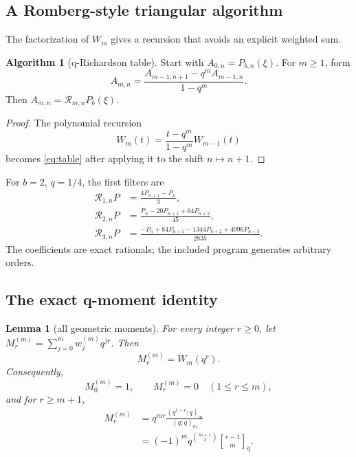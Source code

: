 \documentclass[11pt]{article}
\newtheorem{lemma}[theorem]{Lemma}
\theoremstyle{definition}
\newtheorem{algorithm}[theorem]{Algorithm}
\theoremstyle{remark}
\newcommand{\qbinom}[2]{\genfrac{[}{]}{0pt}{}{#1}{#2}_{q}}
\begin{document}
\subsection{A Romberg-style triangular algorithm}

The factorization of \(W_m\) gives a recursion that avoids an explicit weighted
sum.

\begin{algorithm}[q-Richardson table]
\label{alg:table}
Start with \(A_{0,n}=P_{b,n}(\xi)\). For \(m\geq1\), form
\begin{equation}
 A_{m,n}=\frac{A_{m-1,n+1}-q^mA_{m-1,n}}{1-q^m}.
 \label{eq:table}
\end{equation}
Then \(A_{m,n}=\mathcal R_{m,n}P_b(\xi)\).
\end{algorithm}

\begin{proof}
The polynomial recursion
\[
 W_m(t)=\frac{t-q^m}{1-q^m}W_{m-1}(t)
\]
becomes \eqref{eq:table} after applying it to the shift \(n\mapsto n+1\).
\end{proof}

For \(b=2\), \(q=1/4\), the first filters are
\begin{align}
 \mathcal R_{1,n}P&=\frac{4P_{n+1}-P_n}{3},
 \label{eq:m1}\\
 \mathcal R_{2,n}P&=\frac{P_n-20P_{n+1}+64P_{n+2}}{45},
 \label{eq:m2}\\
 \mathcal R_{3,n}P&=\frac{-P_n+84P_{n+1}-1344P_{n+2}+4096P_{n+3}}{2835}.
 \label{eq:m3}
\end{align}
The coefficients are exact rationals; the included program generates arbitrary
orders.

\subsection{The exact q-moment identity}

\begin{lemma}[all geometric moments]
\label{lem:qmoments}
For every integer \(r\geq0\), let
\(M_r^{(m)}=\sum_{j=0}^m w_j^{(m)}q^{jr}\). Then
\begin{equation}
 M_r^{(m)}=W_m(q^r).
 \label{eq:MrW}
\end{equation}
Consequently,
\begin{equation}
 M_0^{(m)}=1,
 \qquad M_r^{(m)}=0\quad(1\leq r\leq m),
 \label{eq:cancelmom}
\end{equation}
and for \(r\geq m+1\),
\begin{align}
 M_r^{(m)}
 &=q^{mr}\frac{(q^{1-r};q)_m}{(q;q)_m}
 \label{eq:Mrpoch}\\
 &=(-1)^m q^{\binom{m+1}{2}}\qbinom{r-1}{m}.
 \label{eq:Mrqbinom}
\end{align}
\end{lemma}
\end{document}
